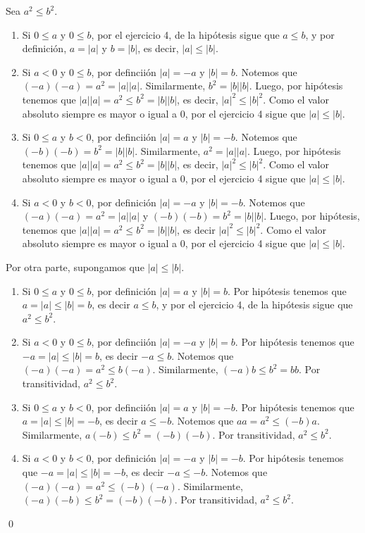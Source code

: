 \documentclass[11pt]{article}
\begin{document}
\begin{enumerate}
Sea $a^2\leq b^2$. \begin{enumerate}[label=\roman*)]
 \item Si $0\leq a$ y $0\leq b$, por el ejercicio 4, de la hipótesis sigue que $a\leq b$, y por definición, $a=|a|$ y $b=|b|$, es decir, $|a|\leq |b|$.
 \item Si $a<0$ y $0 \leq b$, por definciión $|a|=-a$ y $|b|=b$. Notemos que $(-a)(-a)=a^2=|a||a|$. Similarmente, $b^2=|b||b|$. Luego, por hipótesis tenemos que $|a||a|=a^2\leq b^2 = |b||b|$, es decir, $|a|^2\leq |b|^2$. Como el valor absoluto siempre es mayor o igual a $0$, por el ejercicio 4 sigue que $|a|\leq |b|$.
 \item Si $0\leq a$ y $b<0$, por definciión $|a|=a$ y $|b|=-b$. Notemos que $(-b)(-b)=b^2=|b||b|$. Similarmente, $a^2=|a||a|$. Luego, por hipótesis tenemos que $|a||a|=a^2\leq b^2 = |b||b|$, es decir, $|a|^2\leq |b|^2$. Como el valor absoluto siempre es mayor o igual a $0$, por el ejercicio 4 sigue que $|a|\leq |b|$.
 \item Si $a<0$ y $b<0$, por definición $|a|=-a$ y $|b|=-b$. Notemos que $(-a)(-a)=a^2=|a||a|$ y $(-b)(-b)=b^2=|b||b|$. Luego, por hipótesis, tenemos que $|a||a|=a^2\leq b^2 = |b||b|$, es decir $|a|^2\leq |b|^2$. Como el valor absoluto siempre es mayor o igual a $0$, por el ejercicio 4 sigue que $|a|\leq |b|$.
\end{enumerate}
Por otra parte, supongamos que $|a|\leq |b|$. \begin{enumerate}[label=\roman*)]
 \item Si $0\leq a$ y $0\leq b$, por definición $|a|=a$ y $|b|=b$. Por hipótesis tenemos que $a=|a|\leq |b|=b$, es decir $a\leq b$, y por el ejercicio 4, de la hipótesis	sigue que $a^2\leq b^2$.
 \item Si $a<0$ y $0 \leq b$, por definciión $|a|=-a$ y $|b|=b$. Por hipótesis tenemos que $-a=|a|\leq |b|=b$, es decir $-a\leq b$. Notemos que $(-a)(-a)=a^2 \leq b (-a)$. Similarmente, $(-a)b \leq b^2=bb$. Por transitividad, $a^2\leq b^2$.
 \item Si $0\leq a$ y $b<0$, por definciión $|a|=a$ y $|b|=-b$. Por hipótesis tenemos que $a=|a|\leq |b|=-b$, es decir $a\leq -b$. Notemos que $aa=a^2 \leq (-b)a$. Similarmente, $a(-b) \leq b^2=(-b)(-b)$. Por transitividad, $a^2\leq b^2$.
 \item Si $a<0$ y $b<0$, por definición $|a|=-a$ y $|b|=-b$. Por hipótesis tenemos que $-a=|a|\leq |b|=-b$, es decir $-a\leq -b$. Notemos que $(-a)(-a)=a^2 \leq (-b)(-a)$. Similarmente, $(-a)(-b) \leq b^2=(-b)(-b)$. Por transitividad, $a^2\leq b^2$.
\end{enumerate} \qed


\end{enumerate}
\end{document}
